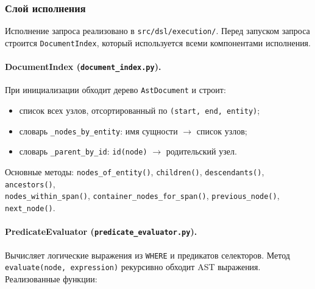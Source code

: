 \documentclass[a4paper,12pt]{article}
\begin{document}
\subsubsection{Слой исполнения}

Исполнение запроса реализовано в \texttt{src/dsl/execution/}. Перед запуском запроса строится \texttt{DocumentIndex}, который используется всеми компонентами исполнения.

\paragraph{DocumentIndex (\texttt{document\_index.py}).}
При инициализации обходит дерево \texttt{AstDocument} и строит:
\begin{itemize}
  \item список всех узлов, отсортированный по \texttt{(start, end, entity)};
  \item словарь \texttt{\_nodes\_by\_entity}: имя сущности $\to$ список узлов;
  \item словарь \texttt{\_parent\_by\_id}: \texttt{id(node)} $\to$ родительский узел.
\end{itemize}
Основные методы: \texttt{nodes\_of\_entity()}, \texttt{children()}, \texttt{descendants()}, \texttt{ancestors()}, \\ \texttt{nodes\_within\_span()}, \texttt{container\_nodes\_for\_span()}, \texttt{previous\_node()}, \texttt{next\_node()}.

\paragraph{PredicateEvaluator (\texttt{predicate\_evaluator.py}).}
Вычисляет логические выражения из \texttt{WHERE} и предикатов селекторов. Метод \texttt{evaluate(node, expression)} рекурсивно обходит AST выражения. Реализованные функции:
\end{document}
